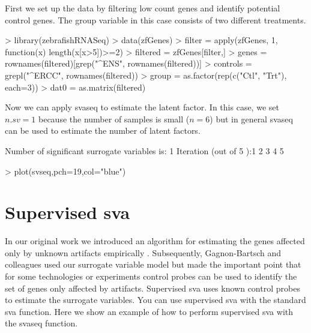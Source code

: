 \documentclass[12pt]{article}
\begin{document}
First we set up the data by filtering low count genes and identify potential control genes. The group variable in this case consists of two different treatments. 

\begin{Schunk}
\begin{Sinput}
> library(zebrafishRNASeq)
> data(zfGenes)
> filter = apply(zfGenes, 1, function(x) length(x[x>5])>=2)
> filtered = zfGenes[filter,]
> genes = rownames(filtered)[grep("^ENS", rownames(filtered))]
> controls = grepl("^ERCC", rownames(filtered))
> group = as.factor(rep(c("Ctl", "Trt"), each=3))
> dat0 = as.matrix(filtered)
\end{Sinput}
\end{Schunk}

Now we can apply svaseq to estimate the latent factor. In this case, we set $n.sv=1$ because the number of samples is small ($n = 6$) but in general svaseq can be used to estimate the number of latent factors. 

\begin{Schunk}
\begin{Soutput}
Number of significant surrogate variables is:  1 
Iteration (out of 5 ):1  2  3  4  5  
\end{Soutput}
\begin{Sinput}
> plot(svseq,pch=19,col="blue")
\end{Sinput}
\end{Schunk}

\section{Supervised sva}


In our original work we introduced an algorithm for estimating the genes affected only by unknown artifacts empirically \cite{leek:2007aa, leek:2008aa}. Subsequently, Gagnon-Bartsch and colleagues \cite{gagnon2012using} used our surrogate variable model but made the important point that for some technologies or experiments control probes can be used to identify the set of genes only affected by artifacts. Supervised sva uses known control probes to estimate the surrogate variables. You can use supervised sva with the standard sva function. Here we show an example of how to perform supervised sva with the svaseq function. 
\end{document}
